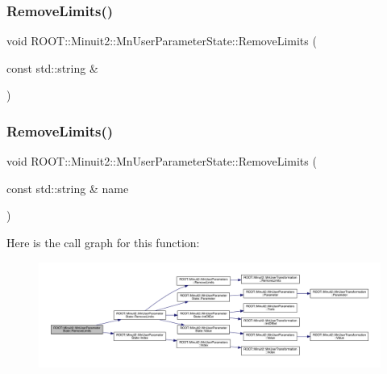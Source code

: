 \subsubsection{\texorpdfstring{RemoveLimits()}{RemoveLimits()}\hspace{0.1cm}{\footnotesize\ttfamily [4/6]}}
{\footnotesize\ttfamily void R\+O\+O\+T\+::\+Minuit2\+::\+Mn\+User\+Parameter\+State\+::\+Remove\+Limits (\begin{DoxyParamCaption}\item[{const std\+::string \&}]{ }\end{DoxyParamCaption})}

\mbox{\label{classROOT_1_1Minuit2_1_1MnUserParameterState_ac71dfd669559be76ed62fdf221a017d5}} 
\subsubsection{\texorpdfstring{RemoveLimits()}{RemoveLimits()}\hspace{0.1cm}{\footnotesize\ttfamily [5/6]}}
{\footnotesize\ttfamily void R\+O\+O\+T\+::\+Minuit2\+::\+Mn\+User\+Parameter\+State\+::\+Remove\+Limits (\begin{DoxyParamCaption}\item[{const std\+::string \&}]{name }\end{DoxyParamCaption})}

Here is the call graph for this function\+:
\nopagebreak
\begin{figure}[H]
\begin{center}
\leavevmode
\includegraphics[width=350pt]{d3/de0/classROOT_1_1Minuit2_1_1MnUserParameterState_ac71dfd669559be76ed62fdf221a017d5_cgraph}
\end{center}
\end{figure}
\mbox{\label{classROOT_1_1Minuit2_1_1MnUserParameterState_ac71dfd669559be76ed62fdf221a017d5}} 
